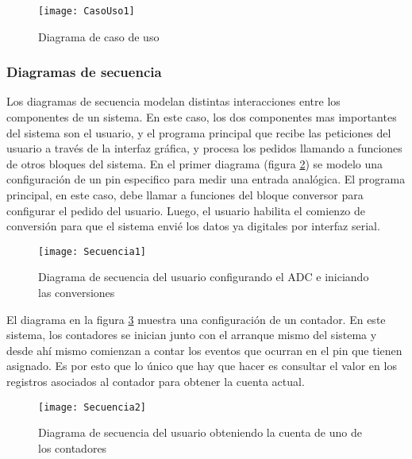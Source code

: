 \begin{figure}[h]
  \centering
  \texttt{[image: CasoUso1]}
  \caption{Diagrama de caso de uso}\label{fig:casouso1}
\end{figure}


\subsubsection{Diagramas de secuencia} %
\label{ssub:diagramas_de_secuencia}

Los diagramas de secuencia modelan distintas interacciones entre los componentes de un sistema. En este caso, los dos componentes mas importantes del sistema son el usuario, y el programa principal que recibe las peticiones del usuario a través de la interfaz gráfica, y procesa los pedidos llamando a funciones de otros bloques del sistema. En el primer diagrama (figura \ref{fig:secuencia1}) se modelo una configuración de un pin especifico para medir una entrada analógica. El programa principal, en este caso, debe llamar a funciones del bloque conversor para configurar el pedido del usuario. Luego, el usuario habilita el comienzo de conversión para que el sistema envié los datos ya digitales por interfaz serial.


\begin{figure}[h]
  \centering
  \texttt{[image: Secuencia1]}
  \caption{Diagrama de secuencia del usuario configurando el ADC e iniciando las conversiones}\label{fig:secuencia1}
\end{figure}

El diagrama en la figura \ref{fig:secuencia2} muestra una configuración de un contador. En este sistema, los contadores se inician junto con el arranque mismo del sistema y desde ahí mismo comienzan a contar los eventos que ocurran en el pin que tienen asignado. Es por esto que lo único que hay que hacer es consultar el valor en los registros asociados al contador para obtener la cuenta actual.


\begin{figure}[h]
  \centering
  \texttt{[image: Secuencia2]}
  \caption{Diagrama de secuencia del usuario obteniendo la cuenta de uno de los contadores}\label{fig:secuencia2}
\end{figure}




\clearpage
